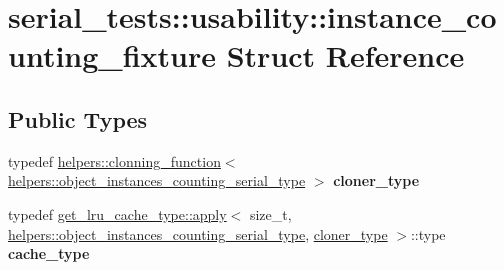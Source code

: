 \hypertarget{structserial__tests_1_1usability_1_1instance__counting__fixture}{}\section{serial\+\_\+tests\+:\+:usability\+:\+:instance\+\_\+counting\+\_\+fixture Struct Reference}
\label{structserial__tests_1_1usability_1_1instance__counting__fixture}
\subsection*{Public Types}
\begin{DoxyCompactItemize}
\item 
\hypertarget{structserial__tests_1_1usability_1_1instance__counting__fixture_af1719d80adb7e37e2c667da088d00646}{}typedef \hyperlink{structserial__tests_1_1usability_1_1helpers_1_1clonning__function}{helpers\+::clonning\+\_\+function}$<$ \hyperlink{structhelpers_1_1object__instances__counting__type}{helpers\+::object\+\_\+instances\+\_\+counting\+\_\+serial\+\_\+type} $>$ {\bfseries cloner\+\_\+type}\label{structserial__tests_1_1usability_1_1instance__counting__fixture_af1719d80adb7e37e2c667da088d00646}

\item 
\hypertarget{structserial__tests_1_1usability_1_1instance__counting__fixture_a31923b79444179a496db8408fd5bb314}{}typedef \hyperlink{structget__lru__cache__type_1_1apply}{get\+\_\+lru\+\_\+cache\+\_\+type\+::apply}$<$ size\+\_\+t, \hyperlink{structhelpers_1_1object__instances__counting__type}{helpers\+::object\+\_\+instances\+\_\+counting\+\_\+serial\+\_\+type}, \hyperlink{structserial__tests_1_1usability_1_1helpers_1_1clonning__function}{cloner\+\_\+type} $>$\+::type {\bfseries cache\+\_\+type}\label{structserial__tests_1_1usability_1_1instance__counting__fixture_a31923b79444179a496db8408fd5bb314}

\end{DoxyCompactItemize}
